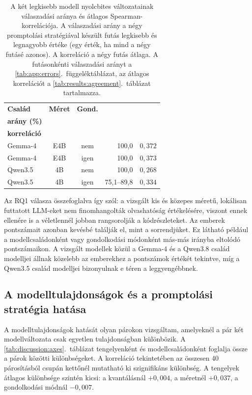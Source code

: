 \documentclass[
]{elteikthesis}[2024/04/26]
\begin{document}
\begin{table}[htbp]
	\centering
	\small
	\begin{tabular}{ | l | c | c | r | r | }
		\hline
		\textbf{Család} &
		\textbf{Méret} &
		\textbf{Gond.} &
		\makecell{\textbf{Válaszadási}\\\textbf{arány (\%)}} &
		\makecell{\textbf{Átlagos Spearman-}\\\textbf{korreláció}} \\
		\hline \hline
		Gemma-4 & E4B & nem & 100,0 & $0{,}372$ \\
		\hline
		Gemma-4 & E4B & igen & 100,0 & $0{,}373$ \\
		\hline
		Qwen3.5 & 4B & nem & 100,0 & $0{,}268$ \\
		\hline
		Qwen3.5 & 4B & igen & 75,1--89,8 & $0{,}334$ \\
		\hline
	\end{tabular}
	\caption[A két legkisebb modell válaszadási aránya és korrelációja]{A két legkisebb modell nyolcbites
	változatainak válaszadási aránya és átlagos Spearman-korrelációja. A válaszadási arány a négy
	promptolási stratégiával készült futás legkisebb és legnagyobb értéke (egy érték, ha mind a négy
	futásé azonos). A korreláció a négy futás átlaga. A futásonkénti válaszadási arányt a
	\ref{tab:app:errors}.~függeléktáblázat, az átlagos korrelációt a \ref{tab:results:agreement}.~táblázat
	tartalmazza.}
	\label{tab:discussion:smallmodels}
\end{table}

Az RQ1 válasza összefoglalva így szól:
a vizsgált kis és közepes méretű, lokálisan futtatott LLM-eket nem finomhangolták olvashatóság értékelésére,
viszont ennek ellenére is a véletlennél jobban rangsorolják a kódrészleteket.
Az emberek pontszámait azonban kevésbé találják el, mint a sorrendjüket.
Ez látható például a modellcsaládonként vagy gondolkodási módonként más-más irányba eltolódó pontszámaikon.
A vizsgált modellek közül a Gemma-4 és a Qwen3.8 család modelljei állnak közelebb az emberekhez
a pontszámok értékét tekintve, míg a Qwen3.5 család modelljei bizonyulnak e téren a leggyengébbnek.

\subsection{A modelltulajdonságok és a promptolási stratégia hatása}
\label{sec:discussion:rq2}

A modelltulajdonságok hatását olyan párokon vizsgáltam,
amelyeknél a pár két modellváltozata csak egyetlen tulajdonságban különbözik.
A \ref{tab:discussion:axes}.~táblázat tengelyenként és modellcsaládonként foglalja össze a párok közötti különbségeket.
A korreláció tekintetében az összesen 40 párosításból csupán kettőnél mutatható ki szignifikáns különbség.
A tengelyek átlagos különbsége szintén kicsi:
a kvantálásnál $+0{,}004$,
a méretnél $+0{,}037$,
a gondolkodási módnál $-0{,}007$.
\end{document}
